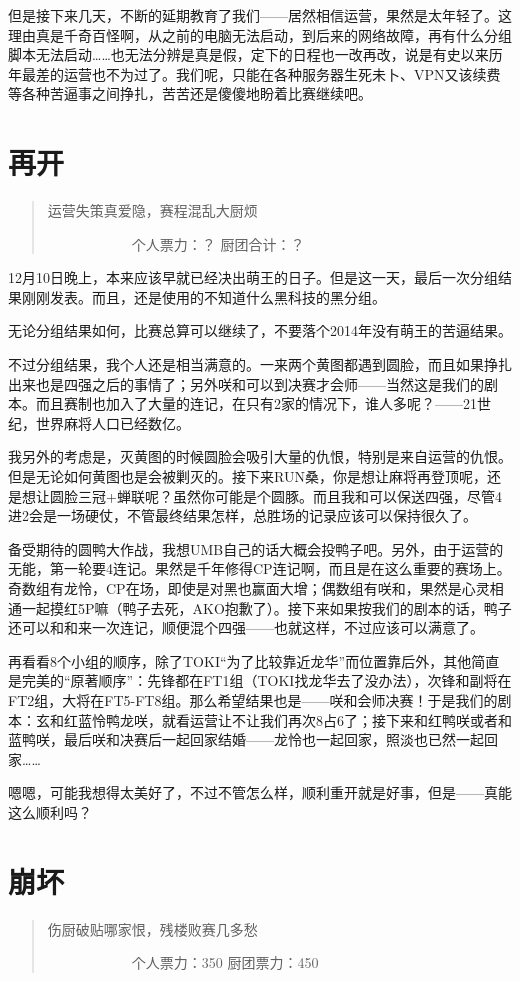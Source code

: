 但是接下来几天，不断的延期教育了我们——居然相信运营，果然是太年轻了。这理由真是千奇百怪啊，从之前的电脑无法启动，到后来的网络故障，再有什么分组脚本无法启动……也无法分辨是真是假，定下的日程也一改再改，说是有史以来历年最差的运营也不为过了。我们呢，只能在各种服务器生死未卜、VPN又该续费等各种苦逼事之间挣扎，苦苦还是傻傻地盼着比赛继续吧。


\section{再开}
\begin{quote}
运营失策真爱隐，赛程混乱大厨烦

　　　　　　个人票力：？ 厨团合计：？
\end{quote}

12月10日晚上，本来应该早就已经决出萌王的日子。但是这一天，最后一次分组结果刚刚发表。而且，还是使用的不知道什么黑科技的黑分组。

无论分组结果如何，比赛总算可以继续了，不要落个2014年没有萌王的苦逼结果。

不过分组结果，我个人还是相当满意的。一来两个黄图都遇到圆脸，而且如果挣扎出来也是四强之后的事情了；另外咲和可以到决赛才会师——当然这是我们的剧本。而且赛制也加入了大量的连记，在只有2家的情况下，谁人多呢？——21世纪，世界麻将人口已经数亿。

我另外的考虑是，灭黄图的时候圆脸会吸引大量的仇恨，特别是来自运营的仇恨。但是无论如何黄图也是会被剿灭的。接下来RUN桑，你是想让麻将再登顶呢，还是想让圆脸三冠+蝉联呢？虽然你可能是个圆豚。而且我和可以保送四强，尽管4进2会是一场硬仗，不管最终结果怎样，总胜场的记录应该可以保持很久了。

备受期待的圆鸭大作战，我想UMB自己的话大概会投鸭子吧。另外，由于运营的无能，第一轮要4连记。果然是千年修得CP连记啊，而且是在这么重要的赛场上。奇数组有龙怜，CP在场，即使是对黑也赢面大增；偶数组有咲和，果然是心灵相通一起摸红5P嘛（鸭子去死，AKO抱歉了）。接下来如果按我们的剧本的话，鸭子还可以和和来一次连记，顺便混个四强——也就这样，不过应该可以满意了。

再看看8个小组的顺序，除了TOKI“为了比较靠近龙华”而位置靠后外，其他简直是完美的“原著顺序”：先锋都在FT1组（TOKI找龙华去了没办法），次锋和副将在FT2组，大将在FT5-FT8组。那么希望结果也是——咲和会师决赛！于是我们的剧本：玄和红蓝怜鸭龙咲，就看运营让不让我们再次8占6了；接下来和红鸭咲或者和蓝鸭咲，最后咲和决赛后一起回家结婚——龙怜也一起回家，照淡也已然一起回家……

嗯嗯，可能我想得太美好了，不过不管怎么样，顺利重开就是好事，但是——真能这么顺利吗？


\section{崩坏}
\begin{quote}
伤厨破贴哪家恨，残楼败赛几多愁

　　　　　　个人票力：350 厨团票力：450
\end{quote}

